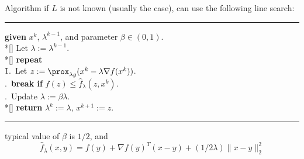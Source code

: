 \documentclass[10pt,mathserif]{beamer}
\begin{document}
\begin{frame}{Algorithm}
    if $L$ is not known (usually the case), can use the following line search:
    \noindent\rule[-5pt]{\textwidth}{0.4pt}
    {\footnotesize
    \begin{tabbing}
        {\bf given} $x^k$, $\lambda^{k-1}$, and parameter $\beta \in (0,1)$. \\*[\smallskipamount]
        Let $\lambda := \lambda^{k-1}$. \\*[\smallskipamount]
        {\bf repeat} \\
        \qquad \= 1.\ Let $z := \prox_{\lambda g}(x^{k} - \lambda \nabla f(x^{k}))$. \\
        .\ {\bf break if} $f(z) \leq \hat{f}_{\lambda}(z, x^{k})$. \\
        .\ Update $\lambda := \beta \lambda$. \\*[\smallskipamount]
        {\bf return} $\lambda^{k} := \lambda$, $x^{k+1}:=z$.
    \end{tabbing}}
    \noindent\rule[10pt]{\textwidth}{0.4pt}

    typical value of $\beta$ is $1/2$, and 
    \[
    \hat{f}_\lambda(x,y) = f(y) + \nabla f(y)^T (x - y) + 
    (1/2\lambda)\|x - y\|_2^2
    \]
\end{frame}
\end{document}
